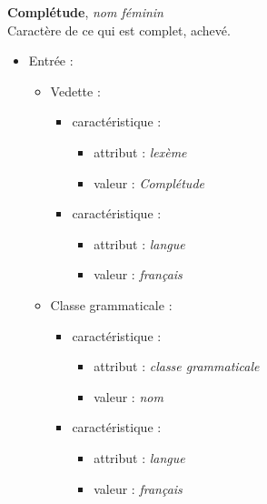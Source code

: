 \documentclass[10pt]{report}
\newcommand{\entité}[1]{\textcolor{blue!80!black}{#1}}
\newcommand{\caractéristique}[1]{\textcolor{green!60!black}{#1}}
\begin{document}
\begin{figure}[h]
	\centering
	\begin{minipage}{0.3\linewidth}
    \textbf{Complétude}, \textit{nom féminin}\\    
    Caractère de ce qui est complet, achevé.
	\end{minipage}%
	\begin{minipage}{0.5\linewidth}
    \begin{itemize}
    	\item \entité{Entrée} :
    	\begin{itemize}
        \item \entité{Vedette} :
        \begin{itemize}
        	\item \entité{caractéristique} :
        	\begin{itemize}
            \item \caractéristique{attribut} : \textit{lexème}
            \item \caractéristique{valeur} : \textit{Complétude}
        	\end{itemize}
            \item \entité{caractéristique} :
        	\begin{itemize}
            \item \caractéristique{attribut} : \textit{langue}
            \item \caractéristique{valeur} : \textit{français}
        	\end{itemize}
        \end{itemize}
        \item \entité{Classe grammaticale} :
        \begin{itemize}
        	\item \entité{caractéristique} :
        	\begin{itemize}
            \item \caractéristique{attribut} : \textit{classe grammaticale}
            \item \caractéristique{valeur} : \textit{nom}
        	\end{itemize}
        	\item \entité{caractéristique} :
        	\begin{itemize}
            \item \caractéristique{attribut} : \textit{langue}
            \item \caractéristique{valeur} : \textit{français}
        	\end{itemize}

\end{itemize}
\end{itemize}
\end{itemize}
\end{minipage}
\end{figure}
\end{document}
